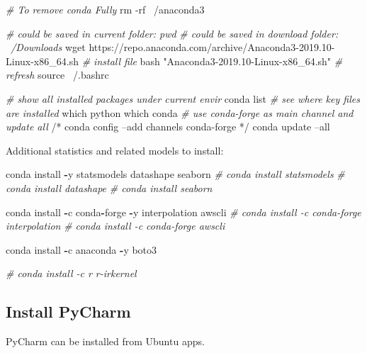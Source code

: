 \documentclass[]{article}
\newenvironment{Shaded}{\begin{snugshade}}{\end{snugshade}}
\newcommand{\BuiltInTok}[1]{#1}
\newcommand{\CommentTok}[1]{\textcolor[rgb]{0.56,0.35,0.01}{\textit{#1}}}
\newcommand{\ExtensionTok}[1]{#1}
\newcommand{\FunctionTok}[1]{\textcolor[rgb]{0.00,0.00,0.00}{#1}}
\newcommand{\NormalTok}[1]{#1}
\newcommand{\OperatorTok}[1]{\textcolor[rgb]{0.81,0.36,0.00}{\textbf{#1}}}
\newcommand{\StringTok}[1]{\textcolor[rgb]{0.31,0.60,0.02}{#1}}
\begin{document}
\begin{Shaded}
\begin{Highlighting}[]
\CommentTok{# To remove conda Fully}
\FunctionTok{rm}\NormalTok{ -rf ~/anaconda3}

\CommentTok{# could be saved in current folder: pwd}
\CommentTok{# could be saved in download folder: ~/Downloads}
\FunctionTok{wget}\NormalTok{ https://repo.anaconda.com/archive/Anaconda3-2019.10-Linux-x86_64.sh}
\CommentTok{# install file}
\FunctionTok{bash} \StringTok{"Anaconda3-2019.10-Linux-x86_64.sh"}
\CommentTok{# refresh}
\BuiltInTok{source}\NormalTok{ ~/.bashrc}

\CommentTok{# show all installed packages under current envir}
\ExtensionTok{conda}\NormalTok{ list}
\CommentTok{# see where key files are installed}
\FunctionTok{which}\NormalTok{ python}
\FunctionTok{which}\NormalTok{ conda}
\CommentTok{# use conda-forge as main channel and update all}
\ExtensionTok{/*}\NormalTok{ conda config --add channels conda-forge */}
\ExtensionTok{conda}\NormalTok{ update --all}
\end{Highlighting}
\end{Shaded}

Additional statistics and related models to install:

\begin{Shaded}
\begin{Highlighting}[]
\NormalTok{conda install }\OperatorTok{-}\NormalTok{y statsmodels datashape seaborn}
\CommentTok{# conda install statsmodels}
\CommentTok{# conda install datashape}
\CommentTok{# conda install seaborn}

\NormalTok{conda install }\OperatorTok{-}\NormalTok{c conda}\OperatorTok{-}\NormalTok{forge }\OperatorTok{-}\NormalTok{y interpolation awscli}
\CommentTok{# conda install -c conda-forge interpolation}
\CommentTok{# conda install -c conda-forge awscli}

\NormalTok{conda install }\OperatorTok{-}\NormalTok{c anaconda }\OperatorTok{-}\NormalTok{y boto3}

\CommentTok{# conda install -c r r-irkernel}
\end{Highlighting}
\end{Shaded}

\hypertarget{install-pycharm}{%
\subsection{Install PyCharm}\label{install-pycharm}}

PyCharm can be installed from Ubuntu apps.
\end{document}
